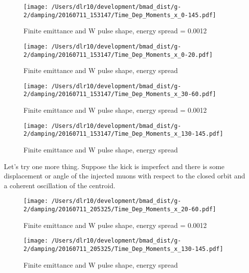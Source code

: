 \documentclass[10pt]{report}
\begin{document}
\begin{figure}[htbp] %
\begin{minipage}[t]{0.48\textwidth}
   \centering
   \texttt{[image: /Users/dlr10/development/bmad\_dist/g-2/damping/20160711\_153147/Time\_Dep\_Moments\_x\_0-145.pdf]} 
   \caption{Finite emittance and W pulse shape, energy spread = 0.0012\label{fig:20160711_153147-finite-emit-tau-energy_0-145}}
 \end{minipage}
\hfill
\begin{minipage}[t]{0.48\textwidth}
   \centering
   \texttt{[image: /Users/dlr10/development/bmad\_dist/g-2/damping/20160711\_153147/Time\_Dep\_Moments\_x\_0-20.pdf]} 
   \caption{Finite emittance and W pulse shape, energy spread\label{fig:20160711_153147-finite-emit-tau-energy_0-20}}
 \end{minipage}
\end{figure}
\begin{figure}[htbp] %
\begin{minipage}[t]{0.48\textwidth}
   \centering
   \texttt{[image: /Users/dlr10/development/bmad\_dist/g-2/damping/20160711\_153147/Time\_Dep\_Moments\_x\_30-60.pdf]} 
   \caption{Finite emittance and W pulse shape, energy spread = 0.0012\label{fig:20160711_153147-finite-emit-tau-energy_0-145}}
 \end{minipage}
\hfill
\begin{minipage}[t]{0.48\textwidth}
   \centering
   \texttt{[image: /Users/dlr10/development/bmad\_dist/g-2/damping/20160711\_153147/Time\_Dep\_Moments\_x\_130-145.pdf]} 
   \caption{Finite emittance and W pulse shape, energy spread\label{fig:20160711_153147-finite-emit-tau-energy_130-145}}
 \end{minipage}
\end{figure}

Let's try one more thing. Suppose the kick is imperfect and there is some displacement or angle of the injected muons with respect to the closed orbit
and a coherent oscillation of the centroid.
\begin{figure}[htbp] %
\begin{minipage}[t]{0.48\textwidth}
   \centering
   \texttt{[image: /Users/dlr10/development/bmad\_dist/g-2/damping/20160711\_205325/Time\_Dep\_Moments\_x\_20-60.pdf]} 
   \caption{Finite emittance and W pulse shape, energy spread = 0.0012\label{fig:20160711_205325-finite-emit-tau-energy_0-20}}
 \end{minipage}
\hfill
\begin{minipage}[t]{0.48\textwidth}
   \centering
   \texttt{[image: /Users/dlr10/development/bmad\_dist/g-2/damping/20160711\_205325/Time\_Dep\_Moments\_x\_130-145.pdf]} 
   \caption{Finite emittance and W pulse shape, energy spread\label{fig:20160711_205325-finite-emit-tau-energy_130-145}}
 \end{minipage}
\end{figure}
\end{document}
